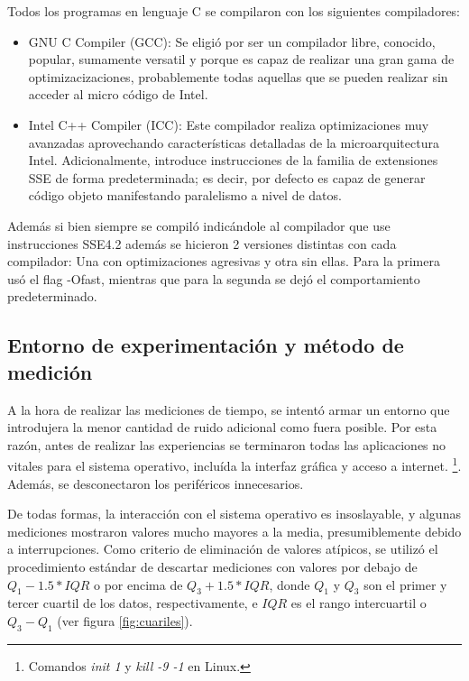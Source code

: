 Todos los programas en lenguaje C se compilaron con los siguientes compiladores:

\begin{itemize}
	\item GNU C Compiler (GCC): Se eligió por ser un compilador libre, conocido, popular, sumamente versatil y porque es capaz de realizar una gran gama de optimizacizaciones, probablemente todas aquellas que se pueden realizar sin acceder al micro código de Intel.

	\item Intel C++ Compiler (ICC): Este compilador realiza optimizaciones muy avanzadas aprovechando características detalladas de la microarquitectura Intel. Adicionalmente, introduce instrucciones de la familia de extensiones SSE de forma predeterminada; es decir, por defecto es capaz de generar código objeto manifestando paralelismo a nivel de datos.
\end{itemize} 
				
Además si bien siempre se compiló indicándole al compilador que use instrucciones SSE4.2 además se hicieron 2 versiones distintas con cada compilador: Una con optimizaciones agresivas y otra sin ellas. Para la primera usó el flag -Ofast, mientras que para la segunda se dejó el comportamiento predeterminado.

\newpage

\subsection{Entorno de experimentación y método de medición}

A la hora de realizar las mediciones de tiempo, se intentó armar un entorno que introdujera la menor cantidad de ruido adicional como fuera posible. Por esta razón, antes de realizar las experiencias se terminaron todas las aplicaciones no vitales para el sistema operativo, incluída la interfaz gráfica y acceso a internet. \footnote{Comandos \emph{init 1} y \emph{kill -9 -1} en Linux.}. Además, se desconectaron los periféricos
innecesarios.

De todas formas, la interacción con el sistema operativo es insoslayable, y algunas mediciones mostraron valores mucho mayores a la media, presumiblemente debido a interrupciones. Como criterio de eliminación de valores atípicos, se utilizó el procedimiento estándar de descartar mediciones con valores por debajo de $Q_1 - 1.5 * IQR$ o por encima de $Q_3 + 1.5 * IQR$, donde $Q_1$ y $Q_3$ son el primer y tercer cuartil de los datos, respectivamente, e $IQR$ es el rango intercuartil o $Q_3 - Q_1$ (ver figura \ref{fig:cuariles}).

